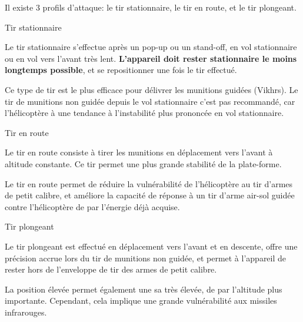 \begin{e1}
	\item Il existe 3 profils d'attaque: le tir stationnaire, le tir en route, et le tir plongeant.

	\item Tir stationnaire

	\begin{e2}
		\item
		Le tir stationnaire s'effectue après un pop-up ou un stand-off, en vol stationnaire ou en vol vers l'avant très lent. \textbf{L'appareil doit rester stationnaire le moins longtemps possible}, et se repositionner une fois le tir effectué.
		\item
		Ce type de tir est le plus efficace pour délivrer les munitions guidées (Vikhrs). Le tir de munitions non guidée depuis le vol stationnaire c'est pas recommandé, car l'hélicoptère à une tendance à l'instabilité plus prononcée en vol stationnaire.
	\end{e2}

	\item Tir en route

	\begin{e2}
		\item Le tir en route consiste à tirer les munitions en déplacement vers l'avant à altitude constante. Ce tir permet une plus grande stabilité de la plate-forme.
		\item
		Le tir en route permet de réduire la vulnérabilité de l'hélicoptère au tir d'armes de petit calibre, et améliore la capacité de réponse à un tir d'arme air-sol guidée contre l'hélicoptère de par l'énergie déjà acquise.
	\end{e2}

	\item Tir plongeant

	\begin{e2}
		\item
		Le tir plongeant est effectué en déplacement vers l'avant et en descente, offre une précision accrue lors du tir de munitions non guidée, et permet à l'appareil de rester hors de l'enveloppe de tir des armes de petit calibre.
	
		\item
		La position élevée permet également une \gls{sa} très élevée, de par l'altitude plus importante. Cependant, cela implique une grande vulnérabilité aux missiles infrarouges.
	\end{e2}
\end{e1}

